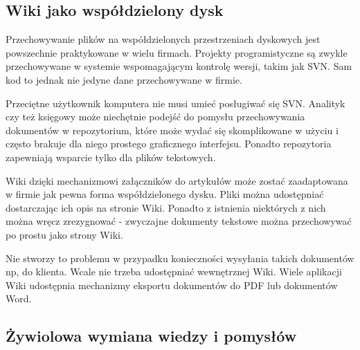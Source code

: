 \documentclass{article}
\begin{document}

	\subsection{Wiki jako współdzielony dysk}
		Przechowywanie plików na współdzielonych przestrzeniach dyskowych jest powszechnie praktykowane w wielu firmach. Projekty programistyczne są zwykle przechowywane w systemie wspomagającym kontrolę wersji, takim jak SVN. Sam kod to jednak nie jedyne dane przechowywane w firmie. 

Przeciętne użytkownik komputera nie musi umieć posługiwać się SVN. Analityk czy też księgowy może niechętnie podejść do pomysłu przechowywania dokumentów w repozytorium, które może wydać się skomplikowane w użyciu i często brakuje dla niego prostego graficznego interfejsu. Ponadto repozytoria zapewniają wsparcie tylko dla plików tekstowych. 

Wiki dzięki mechanizmowi załączników do artykułów może zostać zaadaptowana w firmie jak pewna forma współdzielonego dysku. Pliki można udostępniać dostarczając ich opis na stronie Wiki. Ponadto z istnienia niektórych z nich można wręcz zrezygnować - zwyczajne dokumenty tekstowe można przechowywać po prostu jako strony Wiki.

Nie stworzy to problemu w przypadku konieczności wysyłania takich dokumentów np, do klienta. Wcale nie trzeba udostępniać wewnętrznej Wiki. Wiele aplikacji Wiki udostępnia mechanizmy eksportu dokumentów do PDF lub dokumentów Word.



	\subsection{Żywiolowa wymiana wiedzy i pomysłów}

\end{document}
